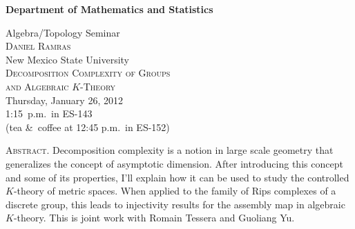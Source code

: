 \documentclass[12pt]{article}
\begin{document}
\noindent\hspace{-28px}%
\hfill\textsf{\textbf{\footnotesize%
Department of Mathematics and Statistics}}\bigskip\bigskip

\begin{center}\Large
  \textsf{{\huge Algebra/Topology Seminar}}\\[2.5\bigskipamount]
  \textsc{Daniel Ramras}\\
  {\large New Mexico State University}\\[\bigskipamount]
  \textsc{Decomposition Complexity of Groups\\ and Algebraic $K$-Theory}\\[2\bigskipamount]
  Thursday, January 26, 2012\\ 1:15~p.m.\ in ES-143\\
  (tea \&\ coffee at 12:45 p.m.\ in ES-152)
\end{center}\bigskip\bigskip

\large\noindent\textsc{Abstract.}
Decomposition complexity is a notion in large scale geometry that generalizes the concept of asymptotic dimension.  After introducing this concept and some of its properties, I'll explain how it can be used to study the controlled $K$-theory of metric spaces.  When applied to the family of Rips complexes of a discrete group, this leads to injectivity results for the assembly map in algebraic $K$-theory.  This is joint work with Romain Tessera and Guoliang Yu.
\end{document}
